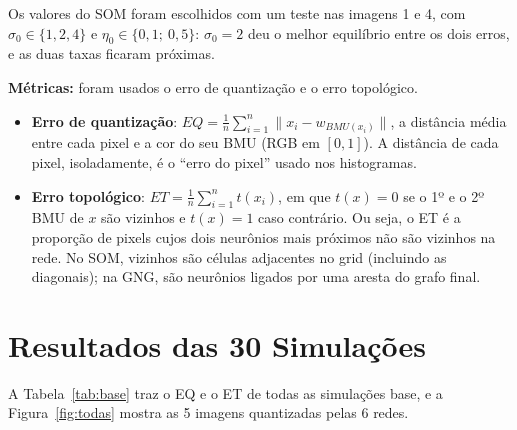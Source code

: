 \documentclass[11pt,a4paper]{article}
\begin{document}
Os valores do SOM foram escolhidos com um teste nas imagens 1 e 4, com $\sigma_0 \in \{1, 2, 4\}$ e $\eta_0 \in \{0{,}1;\ 0{,}5\}$: $\sigma_0 = 2$ deu o melhor equilíbrio entre os dois erros, e as duas taxas ficaram próximas.

\textbf{Métricas:} foram usados o erro de quantização e o erro topológico.
\begin{itemize}
    \item \textbf{Erro de quantização}: $EQ = \frac{1}{n}\sum_{i=1}^{n} \|x_i - w_{BMU(x_i)}\|$, a distância média entre cada pixel e a cor do seu BMU (RGB em $[0, 1]$). A distância de cada pixel, isoladamente, é o ``erro do pixel'' usado nos histogramas.
    \item \textbf{Erro topológico}: $ET = \frac{1}{n}\sum_{i=1}^{n} t(x_i)$, em que $t(x) = 0$ se o 1º e o 2º BMU de $x$ são vizinhos e $t(x) = 1$ caso contrário. Ou seja, o ET é a proporção de pixels cujos dois neurônios mais próximos não são vizinhos na rede. No SOM, vizinhos são células adjacentes no grid (incluindo as diagonais); na GNG, são neurônios ligados por uma aresta do grafo final.
\end{itemize}

\section{Resultados das 30 Simulações}

A Tabela~\ref{tab:base} traz o EQ e o ET de todas as simulações base, e a Figura~\ref{fig:todas} mostra as 5 imagens quantizadas pelas 6 redes.
\end{document}
